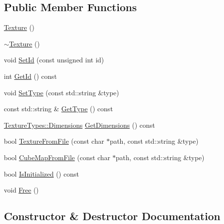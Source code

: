\subsection*{Public Member Functions}
\begin{DoxyCompactItemize}
\item 
\mbox{\hyperlink{classec_1_1_texture_ac2551ef676d0c771f35dc470b8a0b237}{Texture}} ()
\item 
\mbox{\hyperlink{classec_1_1_texture_ae567d80654dd09c6b02a38ca8de29ead}{$\sim$\+Texture}} ()
\item 
void \mbox{\hyperlink{classec_1_1_texture_a83b67b45fa6991f79141f025dd5e269a}{Set\+Id}} (const unsigned int id)
\item 
int \mbox{\hyperlink{classec_1_1_texture_af3ba0bce713e3c54ec5a12c830a99940}{Get\+Id}} () const
\item 
void \mbox{\hyperlink{classec_1_1_texture_a190cc58745400d490ea492112196cb2d}{Set\+Type}} (const std\+::string \&type)
\item 
const std\+::string \& \mbox{\hyperlink{classec_1_1_texture_a5062d684caa000641817a918451eb76a}{Get\+Type}} () const
\item 
\mbox{\hyperlink{structec_1_1_texture_types_aa9ef510185cfe61d20918eb0b2c13501}{Texture\+Types\+::\+Dimensions}} \mbox{\hyperlink{classec_1_1_texture_a774a1f7dfefd55b01e7f645ba3b23660}{Get\+Dimensions}} () const
\item 
bool \mbox{\hyperlink{classec_1_1_texture_a4ad8c7559c57f05d993c895ea6820566}{Texture\+From\+File}} (const char $\ast$path, const std\+::string \&type)
\item 
bool \mbox{\hyperlink{classec_1_1_texture_a4ddfae4d7a899f946f3453ecf3652d51}{Cube\+Map\+From\+File}} (const char $\ast$path, const std\+::string \&type)
\item 
bool \mbox{\hyperlink{classec_1_1_texture_ada1a3d1cc5c86b87e98929457899314e}{Is\+Initialized}} () const
\item 
void \mbox{\hyperlink{classec_1_1_texture_aea77869bff55578f0e8c65f58354e191}{Free}} ()
\end{DoxyCompactItemize}


\subsection{Constructor \& Destructor Documentation}
\mbox{\label{classec_1_1_texture_ac2551ef676d0c771f35dc470b8a0b237}} 
